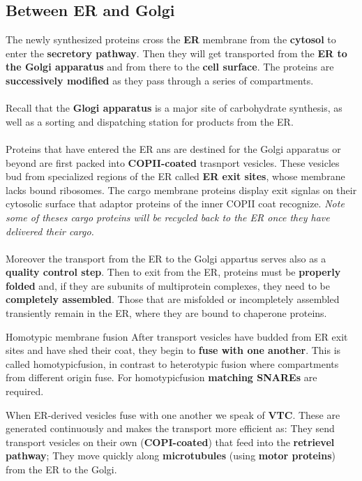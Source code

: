 \documentclass[../main.tex]{subfiles}
\begin{document}
	
\subsection{Between ER and Golgi}
The newly synthesized proteins cross the \textbf{ER} membrane from the \textbf{cytosol} to enter the \textbf{secretory pathway}. Then they will get transported from the \textbf{ER to the Golgi apparatus} and from there to the \textbf{cell surface}. The proteins are \textbf{successively modified} as they pass through a series of compartments. \\
\\ 
Recall that the \textbf{Glogi apparatus} is a major site of carbohydrate synthesis, as well as a sorting and dispatching station for products from the ER. \\
\\
Proteins that have entered the ER ans are destined for the Golgi apparatus or beyond are first packed into \textbf{COPII-coated} trasnport vesicles. These vesicles bud from specialized regions of the ER called \textbf{ER exit sites}, whose membrane lacks bound ribosomes. The cargo membrane proteins display exit signlas on their cytosolic surface that adaptor proteins of the inner COPII coat recognize. \textit{Note some of theses cargo proteins will be recycled back to the ER once they have delivered their cargo.} \\
\\
Moreover the transport from the ER to the Golgi appartus serves also as a \textbf{quality control step}. Then to  exit from the ER, proteins must be \textbf{properly folded} and, if they are subunits of multiprotein complexes, they need to be \textbf{completely assembled}. Those that are misfolded or incompletely assembled transiently remain in the ER, where they are bound to chaperone proteins. 

\begin{DefWithTitle}{Homotypic membrane fusion}
		After transport vesicles have budded from ER exit sites and have shed their coat, they begin to \textbf{fuse with one another}. This is called \gls{homotypicfusion}, in contrast to heterotypic fusion where compartments from different origin fuse. For \gls{homotypicfusion} \textbf{matching SNAREs} are required.	
\end{DefWithTitle}
When ER-derived vesicles fuse with one another we speak of \textbf{\gls{VTC}}. These are generated continuously and makes the transport more efficient as: They send transport vesicles on their own (\textbf{COPI-coated}) that feed into the \textbf{retrievel pathway}; They move quickly along \textbf{microtubules} (using \textbf{motor proteins}) from the ER to the Golgi. 
\end{document}

